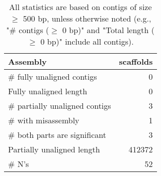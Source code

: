 \documentclass[12pt,a4paper]{article}
\begin{document}
\begin{table}[ht]
\begin{center}
\caption{All statistics are based on contigs of size $\geq$ 500 bp, unless otherwise noted (e.g., "\# contigs ($\geq$ 0 bp)" and "Total length ($\geq$ 0 bp)" include all contigs).}
\begin{tabular}{|l*{1}{|r}|}
\hline
Assembly & scaffolds \\ \hline
\# fully unaligned contigs & 0 \\ \hline
Fully unaligned length & 0 \\ \hline
\# partially unaligned contigs & 3 \\ \hline
\hspace{5mm}\# with misassembly & 1 \\ \hline
\hspace{5mm}\# both parts are significant & 3 \\ \hline
Partially unaligned length & 412372 \\ \hline
\# N's & 52 \\ \hline
\end{tabular}
\end{center}
\end{table}
\end{document}
